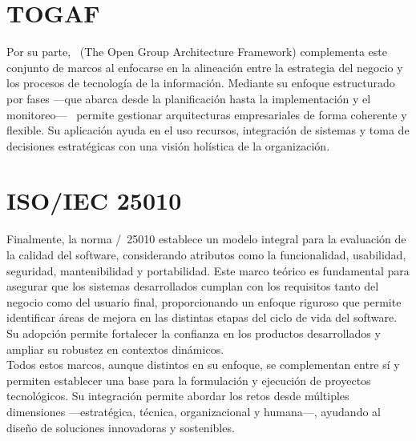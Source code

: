 \section{TOGAF}
Por su parte, \TOGAF\ (The Open Group Architecture Framework) complementa este conjunto de marcos al enfocarse en la alineación entre la estrategia del negocio y los procesos de tecnología de la información. Mediante su enfoque estructurado por fases —que abarca desde la planificación hasta la implementación y el monitoreo— \TOGAF\ permite gestionar arquitecturas empresariales de forma coherente y flexible. Su aplicación ayuda en el uso recursos, integración de sistemas y toma de decisiones estratégicas con una visión holística de la organización\citep{Mumtaza2025}.

\section{ISO/IEC 25010}
Finalmente, la norma \ISO/\IEC\ 25010 establece un modelo integral para la evaluación de la calidad del software, considerando atributos como la funcionalidad, usabilidad, seguridad, mantenibilidad y portabilidad\citep{ISO25010}. Este marco teórico es fundamental para asegurar que los sistemas desarrollados cumplan con los requisitos tanto del negocio como del usuario final, proporcionando un enfoque riguroso que permite identificar áreas de mejora en las distintas etapas del ciclo de vida del software. Su adopción permite fortalecer la confianza en los productos desarrollados y ampliar su robustez en contextos dinámicos.\\

Todos estos marcos, aunque distintos en su enfoque, se complementan entre sí y permiten establecer una base para la formulación y ejecución de proyectos tecnológicos. Su integración permite abordar los retos desde múltiples dimensiones —estratégica, técnica, organizacional y humana—, ayudando al diseño de soluciones innovadoras y sostenibles.
